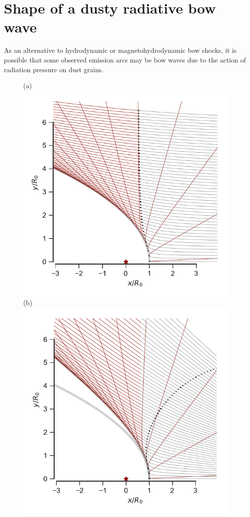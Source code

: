 
\section{Shape of a dusty radiative bow wave}
\label{sec:shape-dust-wave}

As an alternative to hydrodynamic or magnetohydrodynamic bow shocks,
it is possible that some observed emission arcs may be bow waves due
to the action of radiation pressure on dust grains.

\begin{figure}
  (a)\\
  \includegraphics[width=\linewidth]{figs/dust-trajectories}
  (b)\\
  \includegraphics[width=\linewidth]{figs/dust-divergent}

\end{figure}
